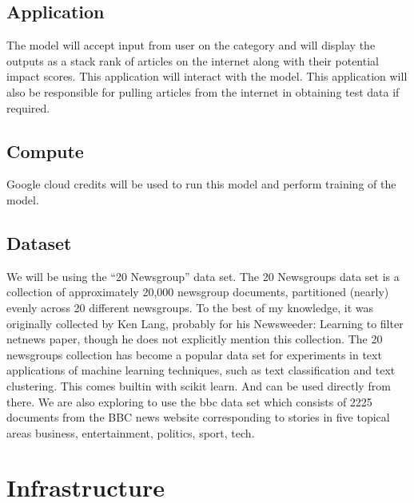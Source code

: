 \documentclass{article}
\begin{document}
\subsection*{Application}
The model will accept input from user on the category and will display the outputs as a stack rank of articles on the internet along with their potential impact scores. This application will interact with the model. This application will also be responsible for pulling articles from the internet in obtaining test data if required.

\subsection*{Compute}
Google cloud credits will be used to run this model and perform training of the model. 

\subsection*{Dataset}
We will be using the “20 Newsgroup” data set. The 20 Newsgroups data set is a collection of approximately 20,000 newsgroup documents, partitioned (nearly) evenly across 20 different newsgroups. To the best of my knowledge, it was originally collected by Ken Lang, probably for his Newsweeder: Learning to filter netnews paper, though he does not explicitly mention this collection. The 20 newsgroups collection has become a popular data set for experiments in text applications of machine learning techniques, such as text classification and text clustering. This comes builtin with scikit learn. And can be used directly from there. \newline
We are also exploring to use the bbc data set which consists of 2225 documents from the BBC news website corresponding to stories in five topical areas business, entertainment, politics, sport, tech. 

\maketitle %


\section*{Infrastructure} %
\end{document}
